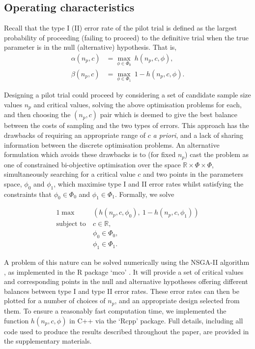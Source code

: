 \documentclass{article}
\begin{document}

\subsection{Operating characteristics}\label{sec:ocs}

Recall that the type I (II) error rate of the pilot trial is defined as the largest probability of proceeding (failing to proceed) to the definitive trial when the true parameter is in the null (alternative) hypothesis. That is, 
\begin{align*}
\alpha(n_p, c) &= \max_{\phi \in \Phi_0} ~ h(n_p, c, \phi) , \\
\beta(n_p, c) &= \max_{\phi \in \Phi_1}  ~ 1 - h(n_p, c, \phi).
\end{align*}

Designing a pilot trial could proceed by considering a set of candidate sample size values $n_p$ and critical values, solving the above optimisation problems for each, and then choosing the $(n_p, c)$ pair which is deemed to give the best balance between the costs of sampling and the two types of errors. This approach has the drawbacks of requiring an appropriate range of $c$ \emph{a priori}, and a lack of sharing information between the discrete optimisation problems. An alternative formulation which avoids these drawbacks is to (for fixed $n_p$) cast the problem as one of constrained bi-objective optimisation over the space $\mathbb{R} \times \Phi \times \Phi$, simultaneously searching for a critical value $c$ and two points in the parameters space, $\phi_0$ and $\phi_1$, which maximise type I and II error rates whilst satisfying the constraints that $\phi_0 \in \Phi_0$ and $\phi_1 \in \Phi_1$. Formally, we solve

\begin{alignat}{1}\label{eqn:MO_opt}
\max ~ & \left( h(n_p, c, \phi_0) , ~ 1 - h(n_p, c, \phi_1)  \right) \\
\text{subject to} ~ & c \in \mathbb{R}, \nonumber \\ 
& \phi_0 \in \Phi_0, \nonumber  \\
& \phi_1 \in \Phi_1. \nonumber 
\end{alignat}

A problem of this nature can be solved numerically using the NSGA-II algorithm \cite{Deb2002}, as implemented in the R package `mco' \cite{Mersmann2014}. It will provide a set of critical values and corresponding points in the null and alternative hypotheses offering different balances between type I and type II error rates. These error rates can then be plotted for a number of choices of $n_p$, and an appropriate design selected from them. To ensure a reasonably fast computation time, we implemented the function $h(n_p, c, \phi)$ in C++ via the `Rcpp' package\cite{Eddelbuettel2011}. Full details, including all code used to produce the results described throughout the paper, are provided in the supplementary materials.
\end{document}
